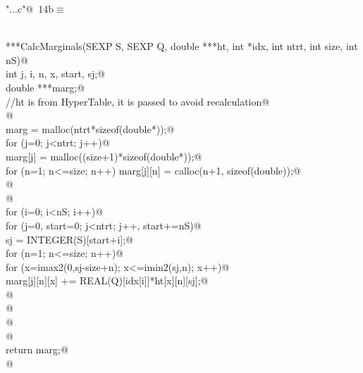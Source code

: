\documentclass[reqno]{amsart}
\renewcommand{\NWtarget}[2]{\hypertarget{#1}{#2}}
\begin{document}
\begin{flushleft} \small\label{scrap24}\raggedright\small
\NWtarget{nuweb14b}{} \verb@"..\src\ReprodCalcs.c"@\nobreak\ {\footnotesize {14b}}$\equiv$
\vspace{-1ex}
\begin{list}{}{} \item
\mbox{}\verb@@\\
\mbox{}\verb@double ***CalcMarginals(SEXP S, SEXP Q, double ***ht, int *idx, int ntrt, int size, int nS){@\\
\mbox{}\verb@   int j, i, n, x, start, sj;@\\
\mbox{}\verb@         double ***marg;@\\
\mbox{}\verb@         //ht is from HyperTable, it is passed to avoid recalculation@\\
\mbox{}\verb@         @\\
\mbox{}\verb@         marg = malloc(ntrt*sizeof(double*));@\\
\mbox{}\verb@         for (j=0; j<ntrt; j++){@\\
\mbox{}\verb@                 marg[j] = malloc((size+1)*sizeof(double*));@\\
\mbox{}\verb@                 for (n=1; n<=size; n++) marg[j][n] = calloc(n+1, sizeof(double));@\\
\mbox{}\verb@         }@\\
\mbox{}\verb@         @\\
\mbox{}\verb@         for (i=0; i<nS; i++){@\\
\mbox{}\verb@                 for (j=0, start=0; j<ntrt; j++, start+=nS){@\\
\mbox{}\verb@                         sj = INTEGER(S)[start+i];@\\
\mbox{}\verb@                         for (n=1; n<=size; n++){@\\
\mbox{}\verb@                                 for (x=imax2(0,sj-size+n); x<=imin2(sj,n); x++){@\\
\mbox{}\verb@                                         marg[j][n][x] += REAL(Q)[idx[i]]*ht[x][n][sj];@\\
\mbox{}\verb@                                 }@\\
\mbox{}\verb@                         }@\\
\mbox{}\verb@                 }@\\
\mbox{}\verb@         }@\\
\mbox{}\verb@  return marg;@\\
\mbox{}\verb@ }@\\

\end{list}
\end{flushleft}
\end{document}
